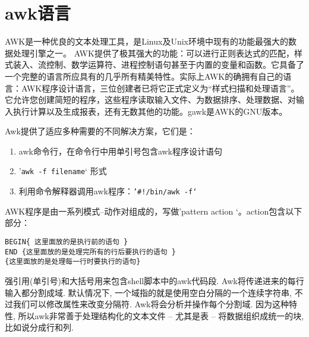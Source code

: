 \section{awk语言}

AWK是一种优良的文本处理工具，是Linux及Unix环境中现有的功能最强大的数据处理引擎之一。
AWK提供了极其强大的功能：可以进行正则表达式的匹配，样式装入、流控制、数学运算符、进程控制语句甚至于内置的变量和函数。它具备了一个完整的语言所应具有的几乎所有精美特性。实际上AWK的确拥有自己的语言：AWK程序设计语言，三位创建者已将它正式定义为“样式扫描和处理语言”。它允许您创建简短的程序，这些程序读取输入文件、为数据排序、处理数据、对输入执行计算以及生成报表，还有无数其他的功能。gawk是AWK的GNU版本。

Awk提供了适应多种需要的不同解决方案，它们是：
\begin{enumerate}
\item awk命令行，在命令行中用单引号包含awk程序设计语句
\item ’\verb$awk -f filename$‘ 形式
\item 利用命令解释器调用awk程序：\verb$’#!/bin/awk -f‘$
\end{enumerate}

AWK程序是由一系列模式--动作对组成的，写做’pattern { action }‘。action包含以下部分：
\begin{verbatim}
BEGIN{ 这里面放的是执行前的语句 }
END {这里面放的是处理完所有的行后要执行的语句 }
{这里面放的是处理每一行时要执行的语句}
\end{verbatim}

强引用(单引号)和大括号用来包含shell脚本中的awk代码段.
Awk将传递进来的每行输入都分割成域. 默认情况下, 一个域指的就是使用空白分隔的一个连续字符串, 不过我们可以修改属性来改变分隔符. Awk将会分析并操作每个分割域. 因为这种特性, 所以awk非常善于处理结构化的文本文件 -- 尤其是表 -- 将数据组织成统一的块, 比如说分成行和列.

